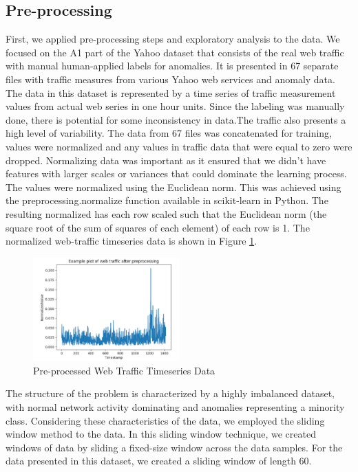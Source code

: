 \documentclass[10pt,twocolumn,letterpaper]{article}
\begin{document}
\subsection{Pre-processing}
First, we applied pre-processing steps and exploratory analysis to the data. We focused on the A1 part of the Yahoo dataset that consists of the real web traffic with manual human-applied labels for anomalies. It is presented in 67 separate files with traffic measures from various Yahoo web services and anomaly data. The data in this dataset is represented by a time series of traffic measurement values from actual web series in one hour units. Since the labeling was manually done, there is potential for some inconsistency in data.The traffic also presents a high level of variability.  The data from 67 files was concatenated for training, values were normalized and any values in traffic data that were equal to zero were dropped. 
Normalizing data was important as it ensured that we didn’t have features with larger scales or variances that could dominate the learning process. 
The values were normalized using the Euclidean norm. This was achieved using the preprocessing.normalize function available in scikit-learn in Python. The resulting normalized has each row scaled such that the Euclidean norm (the square root of the sum of squares of each element) of each row is 1. 
The normalized web-traffic timeseries data is shown in Figure \ref*{pre-process-web-traffic}. 

\begin{figure}[ht]
   \centering
   \includegraphics[width=0.5\textwidth]{images/webtraffic.png}
   \caption{Pre-processed Web Traffic Timeseries Data}
   \label{pre-process-web-traffic}
   \end{figure}

The structure of the problem is characterized by a highly imbalanced dataset, with normal network activity dominating and anomalies representing a minority class.  Considering these characteristics of the data, we employed the sliding window method to the data.
In this sliding window technique, we created  windows of data by sliding a fixed-size window across the data samples. For the data presented in this dataset, we created a sliding window of length 60. 
\end{document}
